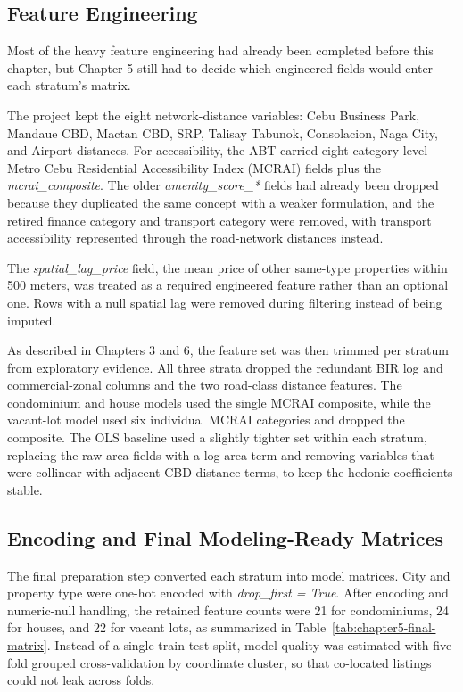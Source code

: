\subsection{Feature Engineering}\label{feature-engineering-ch5}

Most of the heavy feature engineering had already been completed before this chapter, but Chapter 5 still had to decide which engineered fields would enter each stratum's matrix.

The project kept the eight network-distance variables: Cebu Business Park, Mandaue CBD, Mactan CBD, SRP, Talisay Tabunok, Consolacion, Naga City, and Airport distances. For accessibility, the ABT carried eight category-level Metro Cebu Residential Accessibility Index (MCRAI) fields plus the \emph{mcrai\_composite}. The older \emph{amenity\_score\_*} fields had already been dropped because they duplicated the same concept with a weaker formulation, and the retired finance category and transport category were removed, with transport accessibility represented through the road-network distances instead.

The \emph{spatial\_lag\_price} field, the mean price of other same-type properties within 500 meters, was treated as a required engineered feature rather than an optional one. Rows with a null spatial lag were removed during filtering instead of being imputed.

As described in Chapters 3 and 6, the feature set was then trimmed per stratum from exploratory evidence. All three strata dropped the redundant BIR log and commercial-zonal columns and the two road-class distance features. The condominium and house models used the single MCRAI composite, while the vacant-lot model used six individual MCRAI categories and dropped the composite. The OLS baseline used a slightly tighter set within each stratum, replacing the raw area fields with a log-area term and removing variables that were collinear with adjacent CBD-distance terms, to keep the hedonic coefficients stable.


\subsection{Encoding and Final Modeling-Ready Matrices}\label{encoding-and-final-modeling-ready-dataset}

The final preparation step converted each stratum into model matrices. City and property type were one-hot encoded with \emph{drop\_first = True}. After encoding and numeric-null handling, the retained feature counts were 21 for condominiums, 24 for houses, and 22 for vacant lots, as summarized in Table~\ref{tab:chapter5-final-matrix}. Instead of a single train-test split, model quality was estimated with five-fold grouped cross-validation by coordinate cluster, so that co-located listings could not leak across folds.


